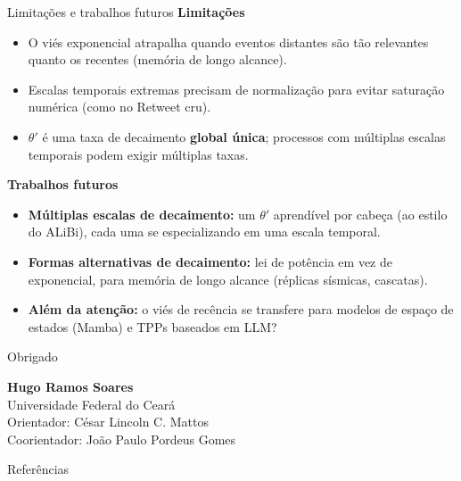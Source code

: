 \documentclass[aspectratio=169,9pt]{beamer}
\begin{document}
\begin{frame}{Limitações e trabalhos futuros}
  \textbf{Limitações}
  \begin{itemize}
    \item O viés exponencial atrapalha quando eventos distantes são tão relevantes
          quanto os recentes (memória de longo alcance).
    \item Escalas temporais extremas precisam de normalização para evitar
          saturação numérica (como no Retweet cru).
    \item $\theta'$ é uma taxa de decaimento \textbf{global única}; processos com
          múltiplas escalas temporais podem exigir múltiplas taxas.
  \end{itemize}
  \vspace{-0.2em}
  \textbf{Trabalhos futuros}
  \begin{itemize}
    \item \textbf{Múltiplas escalas de decaimento:} um $\theta'$ aprendível por
          cabeça (ao estilo do ALiBi), cada uma se especializando em uma escala
          temporal.
    \item \textbf{Formas alternativas de decaimento:} lei de potência em vez de
          exponencial, para memória de longo alcance (réplicas sísmicas, cascatas).
    \item \textbf{Além da atenção:} o viés de recência se transfere para modelos
          de espaço de estados (Mamba) e TPPs baseados em LLM?
  \end{itemize}
\end{frame}

\begin{frame}{Obrigado}
  \begin{center}
    \large \textbf{Hugo Ramos Soares} \\
    \normalsize
    Universidade Federal do Ceará \\
    Orientador: César Lincoln C. Mattos \\
    Coorientador: João Paulo Pordeus Gomes \\
  \end{center}
\end{frame}

\begin{frame}{Referências}
  \scriptsize
  
  
\end{frame}
\end{document}
